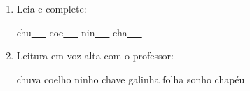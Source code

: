 \begin{exercicio}
\begin{enumerate}[resume]
\begin{enumerate}[label=(\alph*)]
    \item O som da unidade é: ( ) oral ( ) nasal 

    \item A primeira sílaba de CHUVA é: ( ) CHA ( ) LHA

    \item As palavras da unidade aparecem: ( ) no início ( ) no meio ( ) no fim das palavras

  \end{enumerate}

  \item Leia e complete:
  \begin{center}
  chu\underline{~~~} \quad coe\underline{~~~} \quad nin\underline{~~~} \quad cha\underline{~~~}
  \end{center}

  \item Leitura em voz alta com o professor:
  \begin{center}
  chuva \quad coelho \quad ninho \quad chave \quad galinha \quad folha \quad sonho \quad chapéu
  \end{center}

\end{enumerate}

\end{exercicio}



